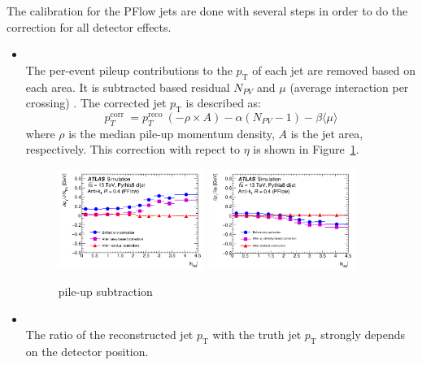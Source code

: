 The calibration for the PFlow jets are done with several steps in order to do the correction for all detector effects. 
\begin{itemize}
    \item \textbf{} \\
    The per-event pileup contributions to the $p_\mathrm{T}$ of each jet are removed based on each area. It is subtracted based residual $N_{PV}$ and $\mu$ (average interaction per crossing) \cite{JETM-2018-05}.
    The corrected jet $p_\mathrm{T}$ is described as:
    \begin{equation}
     p_{T}^{\text {corr }}=p_{T}^{\text {reco }}(-\rho \times A)-\alpha\left(N_{P V}-1\right)-\beta\langle\mu\rangle
    \end{equation}
    where $\rho$ is the median pile-up momentum density, $A$ is the jet area, respectively.
    This correction with repect to $\eta$ is shown in Figure~\ref{fig:pileup}.
    \begin{figure}[tbp]
    \begin{center}
    \includegraphics[width=0.45\textwidth,keepaspectratio]{figures/Reconstruction/intimepileup}
    \includegraphics[width=0.45\textwidth,keepaspectratio]{figures/Reconstruction/outtimepileup}
    \caption{
    pile-up subtraction \cite{JETM-2018-05}
    }
    \label{fig:pileup}
    \end{center}
    \end{figure}
    \item \textbf{} \\
    The ratio of the reconstructed jet $p_\mathrm{T}$ with the truth jet $p_\mathrm{T}$ strongly depends on the detector position. 

\end{itemize}
